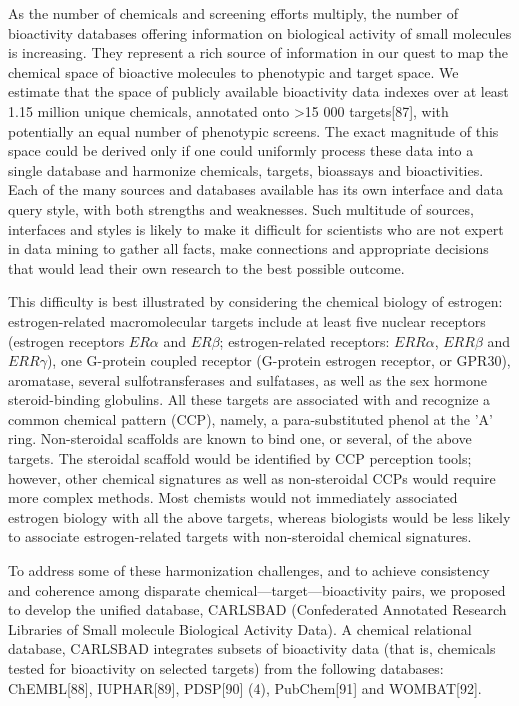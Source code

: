 As the number of chemicals and screening efforts multiply, the number of bioactivity databases offering information on biological activity of small molecules is increasing. They represent a rich source of information in our quest to map the chemical space of bioactive molecules to phenotypic and target space. We estimate that the space of publicly available bioactivity data indexes over at least 1.15 million unique chemicals, annotated onto >15 000 targets[87], with potentially an equal number of phenotypic screens. The exact magnitude of this space could be derived only if one could uniformly process these data into a single database and harmonize chemicals, targets, bioassays and bioactivities. Each of the many sources and databases available has its own interface and data query style, with both strengths and weaknesses. Such multitude of sources, interfaces and styles is likely to make it difficult for scientists who are not expert in data mining to gather all facts, make connections and appropriate decisions that would lead their own research to the best possible outcome.

This difficulty is best illustrated by considering the chemical biology of estrogen: estrogen-related macromolecular targets include at least five nuclear receptors (estrogen receptors $ER\alpha$ and $ER\beta$; estrogen-related receptors: $ERR\alpha$, $ERR\beta$ and $ERR\gamma$), one G-protein coupled receptor (G-protein estrogen receptor, or GPR30), aromatase, several sulfotransferases and sulfatases, as well as the sex hormone steroid-binding globulins. All these targets are associated with and recognize a common chemical pattern (CCP), namely, a para-substituted phenol at the 'A' ring. Non-steroidal scaffolds are known to bind one, or several, of the above targets. The steroidal scaffold would be identified by CCP perception tools; however, other chemical signatures as well as non-steroidal CCPs would require more complex methods. Most chemists would not immediately associated estrogen biology with all the above targets, whereas biologists would be less likely to associate estrogen-related targets with non-steroidal chemical signatures.

To address some of these harmonization challenges, and to achieve consistency and coherence among disparate chemical—target—bioactivity pairs, we proposed to develop the unified database, CARLSBAD (Confederated Annotated Research Libraries of Small molecule Biological Activity Data). A chemical relational database, CARLSBAD integrates subsets of bioactivity data (that is, chemicals tested for bioactivity on selected targets) from the following databases: ChEMBL[88], IUPHAR[89], PDSP[90] (4), PubChem[91] and WOMBAT[92].

